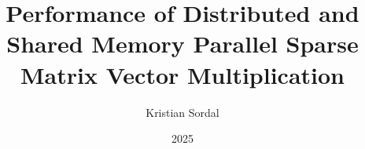 \documentclass[a4paper,12pt]{book} %
\begin{document}
\author{Kristian Sordal}
\title{Performance of Distributed and Shared Memory Parallel Sparse Matrix Vector Multiplication}
\newcommand{\Thesisplaintitle}{Performance of Distributed and Shared Memory Parallel Sparse Matrix Vector Multiplication} 
\date{2025}
\newcommand{\Thesisfulldate}{\today}

\frontmatter






\tableofcontents

\mainmatter









\backmatter

\end{document}
